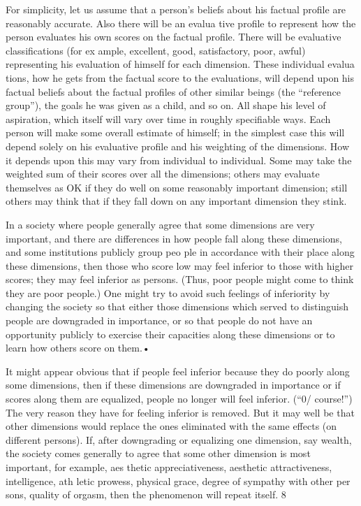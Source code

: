 \documentclass[11pt,openany]{book}
\begin{document}
For simplicity, let us assume that a person's beliefs about his factual profile are reasonably accurate. Also there will be an evalua tive profile to represent how the person evaluates his own scores on the factual profile. There will be evaluative classifications (for ex ample, excellent, good, satisfactory, poor, awful) representing his evaluation of himself for each dimension. These individual evalua tions, how he gets from the factual score to the evaluations, will depend upon his factual beliefs about the factual profiles of other similar beings (the ``reference group''), the goals he was given as a child, and so on. All shape his level of aspiration, which itself will vary over time in roughly specifiable ways. Each person will make some overall estimate of himself; in the simplest case this will depend solely on his evaluative profile and his weighting of the dimensions. How it depends upon this may vary from individual to individual. Some may take the weighted sum of their scores over all the dimensions; others may evaluate themselves as OK if they do well on some reasonably important dimension; still others may think that if they fall down on any important dimension they stink. 

In a society where people generally agree that some dimensions are very important, and there are differences in how people fall along these dimensions, and some institutions publicly group peo ple in accordance with their place along these dimensions, then those who score low may feel inferior to those with higher scores; they may feel inferior as persons. (Thus, poor people might come to think they are poor people.) One might try to avoid such feelings of inferiority by changing the society so that either those dimensions which served to distinguish people are downgraded in importance, or so that people do not have an opportunity publicly to exercise their capacities along these dimensions or to learn how others score on them.• 

It might appear obvious that if people feel inferior because they do poorly along some dimensions, then if these dimensions are downgraded in importance or if scores along them are equalized, people no longer will feel inferior. (``0/ course!'') The very reason they have for feeling inferior is removed. But it may well be that other dimensions would replace the ones eliminated with the same effects (on different persons). If, after downgrading or equalizing one dimension, say wealth, the society comes generally to agree that some other dimension is most important, for example, aes thetic appreciativeness, aesthetic attractiveness, intelligence, ath letic prowess, physical grace, degree of sympathy with other per sons, quality of orgasm, then the phenomenon will repeat itself. 8 
\end{document}
